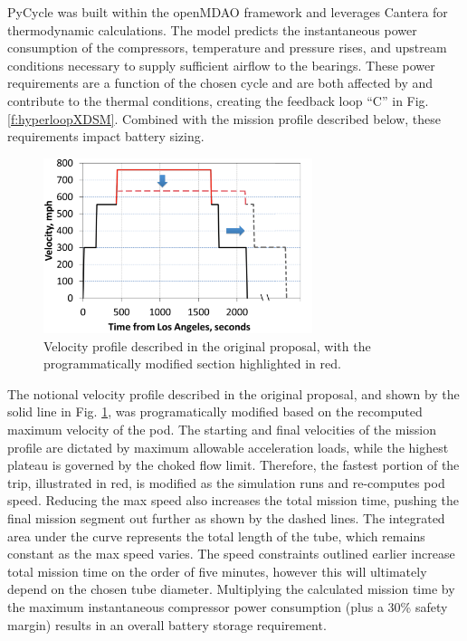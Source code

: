 \documentclass[heading.tex]{subfiles}
\begin{document}
PyCycle was built within the openMDAO framework and leverages Cantera \cite{goodwin2009cantera} for thermodynamic calculations.
The model predicts the instantaneous power consumption of the compressors, temperature and pressure rises,
and upstream conditions necessary to supply sufficient airflow to the bearings.
These power requirements are a function of the chosen cycle and are both affected by
and contribute to the thermal conditions, creating the feedback loop “C” in Fig. \ref{f:hyperloopXDSM}.
Combined with the mission profile described below, these requirements impact battery sizing.

\begin{figure}[hbtp]
\centering
\includegraphics[width=0.7\textwidth]{images/velocity_profile3.png}
\caption{Velocity profile described in the original proposal, with the programmatically modified section highlighted in red.}
\label{f:velocity}
\end{figure}

The notional velocity profile described in the original proposal, and shown by the solid line in Fig. \ref{f:velocity},
was programatically modified based on the recomputed maximum velocity of the pod. The starting and final velocities of the
mission profile are dictated by maximum allowable acceleration loads, while the highest plateau is governed by the
choked flow limit. Therefore, the fastest portion of the trip, illustrated in red, is modified as the simulation runs and re-computes pod speed.
Reducing the max speed also increases the total mission time,
pushing the final mission segment out further as shown by the dashed lines.
The integrated area under the curve represents the total length of the tube, which remains constant as the max speed varies.
The speed constraints outlined earlier increase total mission time on the order of five minutes,
however this will ultimately depend on the chosen tube diameter.
Multiplying the calculated mission time by the maximum instantaneous compressor power consumption (plus a 30\% safety margin)
results in an overall battery storage requirement.
\end{document}
